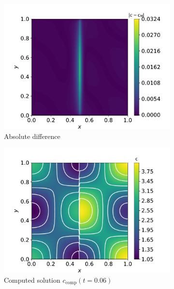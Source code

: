 \begin{figure}  [t]
\begin{subfigure}{0.33\linewidth}
        \centering
        \includegraphics[width=\linewidth]{Figures/Chapter3/monoblocks/interface_condition/diff_t0.01.pdf}
        \caption{Absolute difference}
    \end{subfigure}
    \begin{subfigure}{0.33\linewidth}
        \centering
        \includegraphics[width=\linewidth]{Figures/Chapter3/monoblocks/interface_condition/u_computed_t0.06.pdf}
        \caption{Computed solution $c_\mathrm{comp}(t=0.06)$}
    \end{subfigure}%
    \begin{subfigure}{0.33\linewidth}
        \centering

\end{subfigure}
\end{figure}
